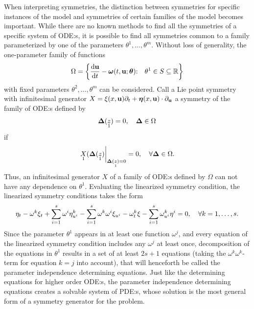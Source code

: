 When interpreting symmetries, the distinction between symmetries for specific instances of the model and symmetries of certain families of the model becomes important.
While there are no known methods to find all the symmetries of a specific system of ODE:s, it is possible to find all symmetries common to a family parameterized by one of the parameters \(\theta^1, \dots, \theta^m\).
Without loss of generality, the one-parameter family of functions
\begin{equation*} %
  \Omega = \left\{\diff{\vb{u}}{t} - \vb*{\omega}(t, \vb{u}; \vb*{\theta})\qq*{:} \theta^1 \in S \subseteq \reals \right\}
\end{equation*}
with fixed parameters \(\theta^2, \dots, \theta^m\) can be considered.
Call a Lie point symmetry with infinitesimal generator \(X = \xi(x, \vb{u}) \partial_t + \vb*{\eta}(x, \vb{u}) \cdot \partial_{\vb{u}}\) a symmetry of the family of ODE:s defined by
\begin{equation*}
  \vb*{\Delta}(\prolong{z}{1}) = 0 \qc \vb*{\Delta} \in \Omega
\end{equation*}
if
\begin{equation*}
  \eval{\prolong{X}{1}(\vb*{\Delta}(\prolong{z}{1})}_{\vb*{\Delta}(\prolong{z}{1}) = 0} = 0 \qc \forall \vb*{\Delta} \in \Omega.
\end{equation*}
Thus, an infinitesimal generator \(X\) of a family of ODE:s defined by \(\Omega\) can not have any dependence on \(\theta^1\).
Evaluating the linearized symmetry condition, the linearized symmetry conditions takes the form
\begin{equation*}
  \eta_t - \omega^k \xi_t + \sum_{i=1}^s \omega^i \eta^k_{u^i} - \sum_{i=1}^s \omega^k \omega^i \xi_{u^i} -
  \omega^k_t \xi - \sum_{i=1}^s \omega^k_{u^i} \eta^i = 0 \qc \forall k = 1, \dots, s.
\end{equation*}
Since the parameter \(\theta^1\) appears in at least one function \(\omega^j\), and every equation of the linearized symmetry condition includes any \(\omega^j\) at least once, decomposition of the equations in \(\theta^1\) results in a set of at least \(2 s + 1\) equations (taking the \(\omega^k \omega^k\)-term for equation \(k = j\) into account), that will henceforth be called the parameter independence determining equations.
Just like the determining equations for higher order ODE:s, the parameter independence determining equations creates a solvable system of PDE:s, whose solution is the most general form of a symmetry generator for the problem.

